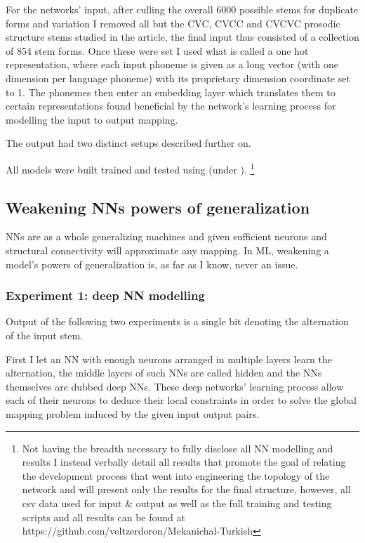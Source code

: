 \documentclass[a4paper,12pt]{article}
\begin{document}
For the networks' input, after culling the overall 6000 possible stems for duplicate forms and
variation I removed all but the CVC, CVCC and CVCVC prosodic structure stems studied in the
article, the final input thus consisted of a collection of 854 stem forms. Once these were set I
used what is called a one hot representation, where each input phoneme is given as a long vector
(with one dimension per language phoneme) with its proprietary dimension coordinate set to 1. The
phonemes then enter an embedding layer which translates them to certain representations found
beneficial by the network's learning process for modelling the input to output mapping.

The output had two distinct setups described further on.

All models were built trained and tested using \cite{chollet_keras_2015} (under
\cite{theano_development_team_theano_2016}).
\footnote{Not having the breadth necessary to fully disclose all NN modelling and results I instead
verbally detail all results that promote the goal of relating the development process that went into
engineering the topology of the network and will present only the results for the final structure,
however, all csv data used for input \& output as well as the full training and testing scripts and
all results can be found at https://github.com/veltzerdoron/Mekanichal-Turkish}

\subsection{Weakening NNs powers of generalization}

NNs are as a whole generalizing machines and given sufficient neurons and structural connectivity
will approximate any mapping. In ML, weakening a model's powers of generalization is, as far as I
know, never an issue.

\subsubsection{Experiment 1: deep NN modelling}

Output of the following two experiments is a single bit denoting the alternation of the input stem.

First I let an NN with enough neurons arranged in multiple layers learn the alternation, the middle
layers of such NNs are called hidden and the NNs themselves are dubbed deep NNs. These deep
networks' learning process allow each of their neurons to deduce their local constraints in order
to solve the global mapping problem induced by the given input output pairs.
\end{document}
